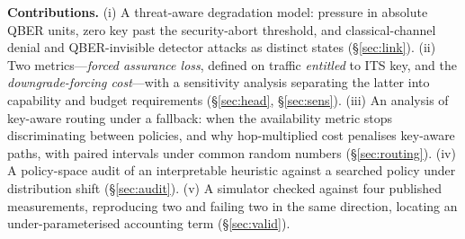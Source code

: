 \documentclass[conference]{IEEEtran}
\begin{document}
\textbf{Contributions.} (i) A threat-aware degradation model: pressure in absolute
QBER units, zero key past the security-abort threshold, and classical-channel
denial and QBER-invisible detector attacks as distinct states (\S\ref{sec:link}).
(ii) Two metrics---\emph{forced assurance loss}, defined on traffic \emph{entitled}
to ITS key, and the \emph{downgrade-forcing cost}---with a sensitivity analysis
separating the latter into capability and budget requirements (\S\ref{sec:head},
\S\ref{sec:sens}).
(iii) An analysis of key-aware routing under a fallback: when the availability
metric stops discriminating between policies, and why hop-multiplied cost penalises
key-aware paths, with paired intervals under common random numbers
(\S\ref{sec:routing}). (iv) A policy-space audit of an interpretable heuristic
against a searched policy under distribution shift (\S\ref{sec:audit}).
(v) A simulator checked against four published measurements, reproducing two and
failing two in the same direction, locating an under-parameterised accounting term
(\S\ref{sec:valid}).
\end{document}
